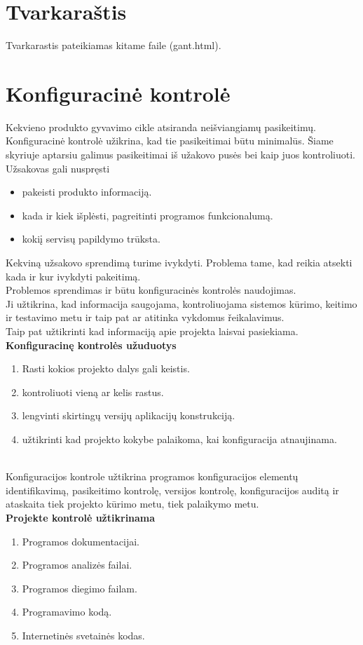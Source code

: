 \documentclass[a4paper,12pt]{article}
\begin{document}
\section{ Tvarkaraštis}


 Tvarkarastis pateikiamas kitame faile (gant.html).


\section{Konfiguracin\. e kontrol\. e}
Kekvieno produkto gyvavimo cikle atsiranda nei\v sviangiam\k u pasikeitim\k u.\\
Konfiguracin\. e kontrol\. e u\v zikrina, kad tie pasikeitimai b\= utu minimal\= us.
\v Siame skyriuje aptarsiu galimus pasikeitimai i\v s u\v zakovo pus\. es bei kaip juos kontroliuoti. \\
U\v zsakovas gali nuspr\k esti
\begin{itemize}
	\item pakeisti produkto informacij\k a.
	\item kada ir kiek i\v spl\. esti, pagreitinti programos funkcionalum\k a.
	\item koki\k i servis\k u papildymo tr\= uksta.
\end{itemize}

Kekvin\k a u\v zsakovo sprendim\k a turime ivykdyti. Problema tame, kad reikia atsekti kada ir kur ivykdyti pakeitim\k a.\\
Problemos sprendimas ir b\= utu konfiguracin\. es kontrol\. es naudojimas.\\
Ji u\v ztikrina, kad informacija saugojama, kontroliuojama sistemos k\= urimo, keitimo ir testavimo metu ir taip pat ar atitinka vykdomus \v reikalavimus. \\
Taip pat u\v ztikrinti kad informacij\k a apie projekta laisvai pasiekiama.\\
\large\textbf{Konfiguracin\k e kontrol\. es u\v zuduotys}
\begin{enumerate}
	\item Rasti kokios projekto dalys gali keistis.
	\item kontroliuoti vien\k a ar kelis rastus.
	\item lengvinti skirting\k u versij\k u aplikacij\k u konstrukcij\k a. 
	\item u\v ztikrinti kad projekto kokybe palaikoma, kai konfiguracija atnaujinama.
\end{enumerate}
\hfill \\
Konfiguracijos kontrole u\v ztikrina programos konfiguracijos element\k u identifikavim\k a, pasikeitimo kontrol\k e, versijos kontrol\k e, konfiguracijos audit\k a ir ataskaita tiek projekto k\= urimo metu, tiek palaikymo metu.\\
\large\textbf{Projekte kontrol\. e u\v ztikrinama}
\begin{enumerate}
	\item Programos dokumentacijai.
	\item Programos analiz\. es failai.
	\item Programos diegimo failam.
	\item Programavimo kodą.
	\item Internetinės svetainės kodas.
\end{enumerate}
\end{document}
